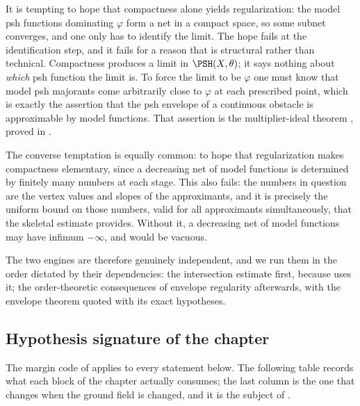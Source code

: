 It is tempting to hope that compactness alone yields regularization: the
model psh functions dominating \(\varphi\) form a net in a compact space, so
some subnet converges, and one only has to identify the limit.  The hope
fails at the identification step, and it fails for a reason that is
structural rather than technical.  Compactness produces a limit in
\(\PSH(X,\theta)\); it says nothing about \emph{which} psh function the
limit is.  To force the limit to be \(\varphi\) one must know that model psh
majorants come arbitrarily close to \(\varphi\) at each prescribed point,
which is exactly the assertion that the psh envelope of a continuous
obstacle is approximable by model functions.  That assertion is the
multiplier-ideal theorem , proved in
.

The converse temptation is equally common: to hope that regularization makes
compactness elementary, since a decreasing net of model functions is
determined by finitely many numbers at each stage.  This also fails: the
numbers in question are the vertex values and slopes of the approximants,
and it is precisely the uniform bound on those numbers, valid for all
approximants simultaneously, that the skeletal estimate provides.  Without
it, a decreasing net of model functions may have infimum \(-\infty\), and
 would be vacuous.

The two engines are therefore genuinely independent, and we run them in the
order dictated by their dependencies: the intersection estimate first,
because  uses it; the order-theoretic
consequences of envelope regularity afterwards, with the envelope theorem
quoted with its exact hypotheses.

\subsection{Hypothesis signature of the chapter}
\label{sec:ch22-signature}

The margin code of  applies to every statement
below.  The following table records what each block of the chapter actually
consumes; the last column is the one that changes when the ground field is
changed, and it is the subject of .

